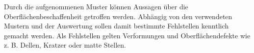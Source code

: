 \p
Durch die aufgenommenen Muster können Aussagen über die Oberflächenbeschaffenheit getroffen werden.
Abhängig von den verwendeten Mustern und der Auswertung sollen damit bestimmte Fehlstellen kenntlich gemacht werden.
Als Fehlstellen gelten Verformungen und Oberflächendefekte wie z. B. Dellen, Kratzer oder matte Stellen.

